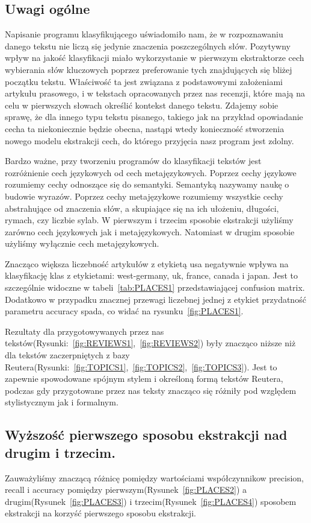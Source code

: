 \documentclass{classrep}
\begin{document}
\subsection{Uwagi ogólne}
	Napisanie programu klasyfikującego uświadomiło nam, że w rozpoznawaniu danego tekstu nie liczą się jedynie znaczenia poszczególnych słów. Pozytywny wpływ na jakość klasyfikacji miało wykorzystanie w pierwszym ekstraktorze cech wybierania słów kluczowych poprzez preferowanie tych znajdujących się bliżej początku tekstu. Właściwość ta jest związana z podstawowymi założeniami artykułu prasowego, i w tekstach opracowanych przez nas recenzji, które mają na celu w pierwszych słowach określić kontekst danego tekstu. Zdajemy sobie sprawę, że dla innego typu tekstu pisanego, takiego jak na przykład opowiadanie cecha ta niekoniecznie będzie obecna, nastąpi wtedy konieczność stworzenia nowego modelu ekstrakcji cech, do którego przyjęcia nasz program jest zdolny.
	
	Bardzo ważne, przy tworzeniu programów do klasyfikacji tekstów jest rozróżnienie cech językowych od cech metajęzykowych. Poprzez cechy językowe rozumiemy cechy odnoszące się do semantyki. Semantyką nazywamy naukę o budowie wyrazów. Poprzez cechy metajęzykowe rozumiemy wszystkie cechy abstrahujące od znaczenia słów, a skupiające się na ich ułożeniu, długości, rymach, czy liczbie sylab. W pierwszym i trzecim sposobie ekstrakcji użyliśmy zarówno cech językowych jak i metajęzykowych. Natomiast w drugim sposobie użyliśmy wyłącznie cech metajęzykowych.
	
	Znacząco większa liczebność artykułów z etykietą usa negatywnie wpływa na klasyfikację klas z etykietami: west-germany, uk, france, canada i japan. Jest to szczególnie widoczne w tabeli~\ref{tab:PLACES1} przedstawiającej confusion matrix. Dodatkowo w przypadku znacznej przewagi liczebnej jednej z etykiet przydatność parametru accuracy spada, co widać na rysunku~\ref{fig:PLACES1}.
	
	Rezultaty dla przygotowywanych przez nas tekstów(Rysunki:~\ref{fig:REVIEWS1},~\ref{fig:REVIEWS2}) były znacząco niższe niż dla tekstów zaczerpniętych z bazy Reutera(Rysunki:~\ref{fig:TOPICS1},~\ref{fig:TOPICS2},~\ref{fig:TOPICS3}). Jest to zapewnie spowodowane spójnym stylem i określoną formą tekstów Reutera, podczas gdy przygotowane przez nas teksty znacząco się różniły pod względem stylistycznym jak i formalnym.
	
\subsection{Wyższość pierwszego sposobu ekstrakcji nad drugim i trzecim.}
    Zauważyliśmy znaczącą różnicę pomiędzy wartościami współczynnikow precision, recall i accuracy pomiędzy pierwszym(Rysunek~\ref{fig:PLACES2}) a drugim(Rysunek~\ref{fig:PLACES3}) i trzecim(Rysunek~\ref{fig:PLACES4}) sposobem ekstrakcji na korzyść pierwszego sposobu ekstrakcji.
    
\end{document}
